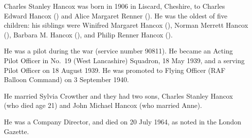 
Charles Stanley Hancox was born in 1906 in Liscard, Cheshire, to Charles Edward Hancox () and Alice Margaret Renner ().\cite{CSHancoxBirth} He was the oldest of five children: his siblings were Winifred Margaret Hancox (), Norman Merrett Hancox (), Barbara M. Hancox (), and Philip Renner Hancox ().

He was a pilot during the war (service number 90811).
He became an Acting Pilot Officer in No.~19 (West Lancashire) Squadron, 18 May 1939, \cite{CSHancox1} and a serving Pilot Officer on 18 August 1939. \cite{CSHancox2}  He was promoted to Flying Officer (RAF Balloon Command) on 3 September 1940. \cite{CSHancox3}

He married Sylvia Crowther and they had two sons, Charles Stanley Hancox (who died age 21) and John Michael Hancox (who married Anne).
	
He was a Company Director, and died on 20 July 1964, as noted in the London Gazette. \cite{CSHancoxDeath}
